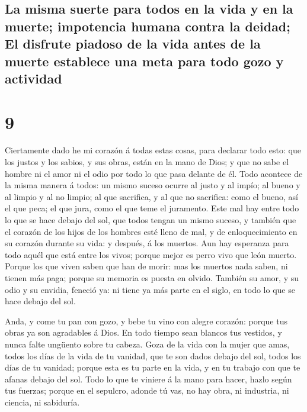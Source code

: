 \hypertarget{la-misma-suerte-para-todos-en-la-vida-y-en-la-muerte-impotencia-humana-contra-la-deidad-el-disfrute-piadoso-de-la-vida-antes-de-la-muerte-establece-una-meta-para-todo-gozo-y-actividad}{%
\subsection{La misma suerte para todos en la vida y en la muerte;
impotencia humana contra la deidad; El disfrute piadoso de la vida antes
de la muerte establece una meta para todo gozo y
actividad}\label{la-misma-suerte-para-todos-en-la-vida-y-en-la-muerte-impotencia-humana-contra-la-deidad-el-disfrute-piadoso-de-la-vida-antes-de-la-muerte-establece-una-meta-para-todo-gozo-y-actividad}}

\hypertarget{section-21-9}{%
\section{9}\label{section-21-9}}

 Ciertamente dado he mi corazón á todas estas cosas, para
declarar todo esto: que los justos y los sabios, y sus obras, están en
la mano de Dios; y que no sabe el hombre ni el amor ni el odio por todo
lo que pasa delante de él.  Todo acontece de la misma
manera á todos: un mismo suceso ocurre al justo y al impío; al bueno y
al limpio y al no limpio; al que sacrifica, y al que no sacrifica: como
el bueno, así el que peca; el que jura, como el que teme el juramento.
 Este mal hay entre todo lo que se hace debajo del sol,
que todos tengan un mismo suceso, y también que el corazón de los hijos
de los hombres esté lleno de mal, y de enloquecimiento en su corazón
durante su vida: y después, á los muertos.  Aun hay
esperanza para todo aquél que está entre los vivos; porque mejor es
perro vivo que león muerto.  Porque los que viven saben
que han de morir: mas los muertos nada saben, ni tienen más paga; porque
su memoria es puesta en olvido.  También su amor, y su
odio y su envidia, feneció ya: ni tiene ya más parte en el siglo, en
todo lo que se hace debajo del sol.

 Anda, y come tu pan con gozo, y bebe tu vino con alegre
corazón: porque tus obras ya son agradables á Dios.  En
todo tiempo sean blancos tus vestidos, y nunca falte ungüento sobre tu
cabeza.  Goza de la vida con la mujer que amas, todos los
días de la vida de tu vanidad, que te son dados debajo del sol, todos
los días de tu vanidad; porque esta es tu parte en la vida, y en tu
trabajo con que te afanas debajo del sol.  Todo lo que te
viniere á la mano para hacer, hazlo según tus fuerzas; porque en el
sepulcro, adonde tú vas, no hay obra, ni industria, ni ciencia, ni
sabiduría.

